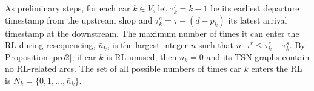 \documentclass[12pt]{article}
\begin{document}



As preliminary steps, for each car $k\in V$, let $\tau^s_k=k-1$ be its earliest departure timestamp from the upstream shop and $\tau^e_k=\tau-(d-p_k)$ its latest arrival timestamp at the downstream. The maximum number of times it can enter the RL during resequencing, $\bar{n}_k$, is the largest integer $n$ such that $n\cdot\tau^r\leqslant\tau^e_k-\tau^s_k$. By Proposition \ref{pro2}, if car $k$ is RL-unused, then $\bar{n}_k=0$ and its TSN graphs contain no RL-related arcs. The set of all possible numbers of times car $k$ enters the RL is $N_k=\{0,1,\dots,\bar{n}_k\}$.
\end{document}
